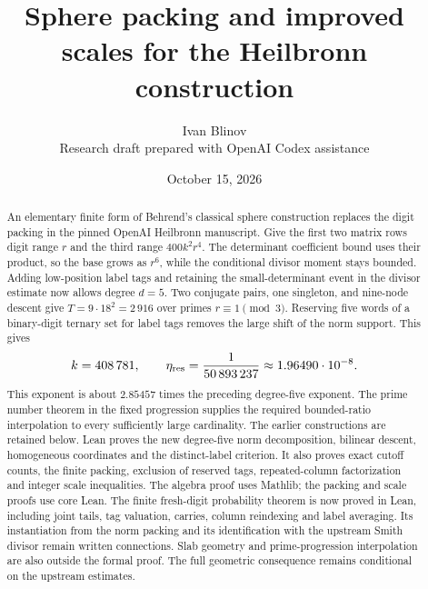 \documentclass[11pt]{article}
\title{Sphere packing and improved scales for the Heilbronn construction}
\author{Ivan Blinov\\\small Research draft prepared with OpenAI Codex assistance}
\date{October 15, 2026}
\begin{document}
\maketitle
\begin{abstract}
An elementary finite form of Behrend's classical sphere construction
replaces the digit packing in the pinned OpenAI Heilbronn manuscript.
Give the first two matrix rows digit range $r$ and the third range
$400k^2r^4$. The determinant coefficient bound uses their product, so
the base grows as $r^6$, while the conditional divisor moment stays bounded.
Adding low-position label tags and retaining the small-determinant event
in the divisor estimate now allows degree $d=5$. Two conjugate pairs,
one singleton, and nine-node descent give $T=9\cdot18^2=2\,916$ over primes
$r\equiv1\pmod3$. Reserving five words of a binary-digit ternary set for
label tags removes the large shift of the norm support. This gives
\[
 k=408\,781,\qquad
 \eta_{\rm res}=\frac{1}{50\,893\,237}
       \approx1.96490\cdot10^{-8}.
\]
This exponent is about $2.85457$ times the preceding degree-five exponent.
The prime number theorem in the fixed progression supplies the required
bounded-ratio interpolation to every sufficiently large cardinality.
The earlier constructions are retained below.
Lean proves the new degree-five norm decomposition, bilinear descent,
homogeneous coordinates and the distinct-label criterion.
It also proves exact cutoff counts, the finite packing, exclusion of
reserved tags, repeated-column factorization and integer scale inequalities.
The algebra proof uses Mathlib;
the packing and scale proofs use core Lean.
The finite fresh-digit probability theorem is now proved in Lean, including
joint tails, tag valuation, carries, column reindexing and label averaging.
Its instantiation from the norm packing and its identification with the
upstream Smith divisor remain written connections. Slab geometry and
prime-progression interpolation are also outside the formal proof.
The full geometric consequence remains conditional on the upstream estimates.
\end{abstract}
\end{document}
